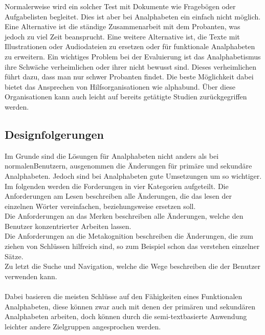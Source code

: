 Normalerweise wird ein solcher Test mit Dokumente wie Fragebögen oder Aufgabelisten begleitet. 
Dies ist aber bei Analphabeten ein einfach nicht möglich.
Eine Alternative ist die ständige Zusammenarbeit mit dem Probanten, was jedoch zu viel Zeit beansprucht. Eine weitere Alternative ist, die Texte mit Illustrationen oder Audiodateien zu ersetzen oder für funktionale Analphabeten zu erweitern. Ein wichtiges Problem bei der Evaluierung ist das Analphabetismus ihre Schwäche verheimlichen oder ihrer nicht bewusst sind. Dieses verheimlichen führt dazu, dass man nur schwer Probanten findet. Die beste Möglichkeit dabei bietet das Ansprechen von Hilfsorganisationen wie \glqq alphabund\grqq. Über diese Organisationen kann auch leicht auf bereits getätigte Studien zurückgegriffen werden.

\subsection{ Designfolgerungen }
Im Grunde sind die Lösungen für Analphabeten nicht anders als bei \glqq normalen\grqq Benutzern, ausgenommen die Änderungen für primäre und sekundäre Analphabeten. Jedoch sind bei Analphabeten gute Umsetzungen um so wichtiger.\\
Im folgenden werden die Forderungen in vier Kategorien aufgeteilt. 
Die Anforderungen am Lesen beschreiben alle Änderungen, die das lesen der einzelnen Wörter vereinfachen, beziehungsweise ersetzen soll.\\
Die Anforderungen an das Merken beschreiben alle Änderungen, welche den Benutzer konzentrierter Arbeiten lassen.\\
Die Anforderungen an die Metakognition beschreiben die Änderungen, die zum ziehen von Schlüssen hilfreich sind, so zum Beispiel schon das verstehen einzelner Sätze.\\
Zu letzt die Suche und Navigation, welche die Wege beschreiben die der Benutzer verwenden kann.\\\\
Dabei basieren die meisten Schlüsse auf den Fähigkeiten eines Funktionalen Analphabeten, diese können zwar auch mit denen der primären und sekundären Analphabeten arbeiten, doch können durch die semi-textbasierte Anwendung leichter andere Zielgruppen angesprochen werden.

